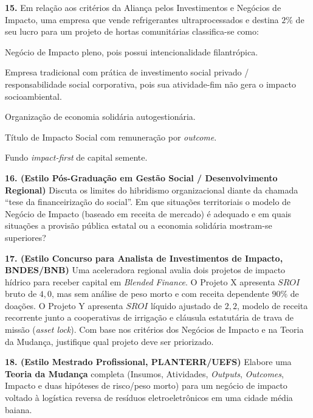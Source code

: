 \textbf{15.} Em relação aos critérios da Aliança pelos Investimentos e Negócios de Impacto, uma empresa que vende refrigerantes ultraprocessados e destina $2\%$ de seu lucro para um projeto de hortas comunitárias classifica-se como:
\begin{alternativas}
  \item Negócio de Impacto pleno, pois possui intencionalidade filantrópica.
  \item Empresa tradicional com prática de investimento social privado / responsabilidade social corporativa, pois sua atividade-fim não gera o impacto socioambiental.
  \item Organização de economia solidária autogestionária.
  \item Título de Impacto Social com remuneração por \textit{outcome}.
  \item Fundo \textit{impact-first} de capital semente.
\end{alternativas}


\textbf{16. (Estilo Pós-Graduação em Gestão Social / Desenvolvimento Regional)} Discuta os limites do hibridismo organizacional diante da chamada ``tese da financeirização do social''. Em que situações territoriais o modelo de Negócio de Impacto (baseado em receita de mercado) é adequado e em quais situações a provisão pública estatal ou a economia solidária mostram-se superiores?
\espacoResolucao[2.2cm]

\textbf{17. (Estilo Concurso para Analista de Investimentos de Impacto, BNDES/BNB)} Uma aceleradora regional avalia dois projetos de impacto hídrico para receber capital em \textit{Blended Finance}. O Projeto X apresenta $SROI$ bruto de $4{,}0$, mas sem análise de peso morto e com receita dependente $90\%$ de doações. O Projeto Y apresenta $SROI$ líquido ajustado de $2{,}2$, modelo de receita recorrente junto a cooperativas de irrigação e cláusula estatutária de trava de missão (\textit{asset lock}). Com base nos critérios dos Negócios de Impacto e na Teoria da Mudança, justifique qual projeto deve ser priorizado.
\espacoResolucao[2.2cm]

\textbf{18. (Estilo Mestrado Profissional, PLANTERR/UEFS)} Elabore uma \textbf{Teoria da Mudança} completa (Insumos, Atividades, \textit{Outputs}, \textit{Outcomes}, Impacto e duas hipóteses de risco/peso morto) para um negócio de impacto voltado à logística reversa de resíduos eletroeletrônicos em uma cidade média baiana.
\espacoResolucao[2.2cm]

